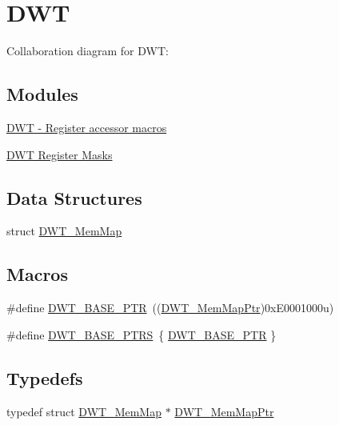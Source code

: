 \hypertarget{group___d_w_t___peripheral}{}\section{D\+WT}
\label{group___d_w_t___peripheral}
Collaboration diagram for D\+WT\+:
\subsection*{Modules}
\begin{DoxyCompactItemize}
\item 
\hyperlink{group___d_w_t___register___accessor___macros}{D\+W\+T -\/ Register accessor macros}
\item 
\hyperlink{group___d_w_t___register___masks}{D\+W\+T Register Masks}
\end{DoxyCompactItemize}
\subsection*{Data Structures}
\begin{DoxyCompactItemize}
\item 
struct \hyperlink{struct_d_w_t___mem_map}{D\+W\+T\+\_\+\+Mem\+Map}
\end{DoxyCompactItemize}
\subsection*{Macros}
\begin{DoxyCompactItemize}
\item 
\#define \hyperlink{group___d_w_t___peripheral_ga3b46dfb2ea7946c6938028d879c82cb1}{D\+W\+T\+\_\+\+B\+A\+S\+E\+\_\+\+P\+TR}~((\hyperlink{group___d_w_t___peripheral_ga8a09a1b28d871c18ae8c69f67af6d573}{D\+W\+T\+\_\+\+Mem\+Map\+Ptr})0x\+E0001000u)
\item 
\#define \hyperlink{group___d_w_t___peripheral_ga606d55285f2df3c4bb43272ec842b475}{D\+W\+T\+\_\+\+B\+A\+S\+E\+\_\+\+P\+T\+RS}~\{ \hyperlink{group___d_w_t___peripheral_ga3b46dfb2ea7946c6938028d879c82cb1}{D\+W\+T\+\_\+\+B\+A\+S\+E\+\_\+\+P\+TR} \}
\end{DoxyCompactItemize}
\subsection*{Typedefs}
\begin{DoxyCompactItemize}
\item 
typedef struct \hyperlink{struct_d_w_t___mem_map}{D\+W\+T\+\_\+\+Mem\+Map} $\ast$ \hyperlink{group___d_w_t___peripheral_ga8a09a1b28d871c18ae8c69f67af6d573}{D\+W\+T\+\_\+\+Mem\+Map\+Ptr}
\end{DoxyCompactItemize}


